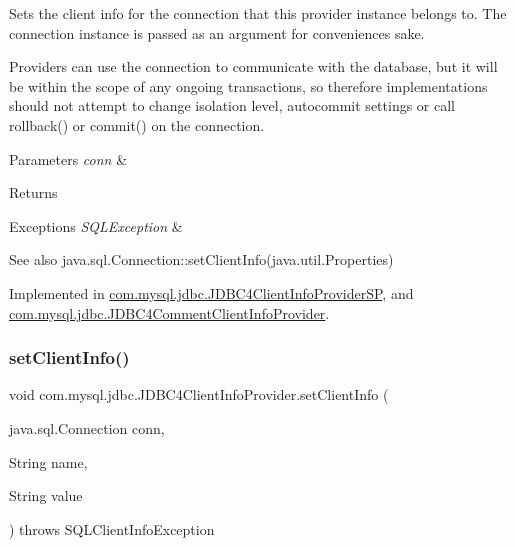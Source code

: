 Sets the client info for the connection that this provider instance belongs to. The connection instance is passed as an argument for convenience\textquotesingle{}s sake.

Providers can use the connection to communicate with the database, but it will be within the scope of any ongoing transactions, so therefore implementations should not attempt to change isolation level, autocommit settings or call rollback() or commit() on the connection.


\begin{DoxyParams}{Parameters}
{\em conn} & \\
\hline
\end{DoxyParams}
\begin{DoxyReturn}{Returns}

\end{DoxyReturn}

\begin{DoxyExceptions}{Exceptions}
{\em S\+Q\+L\+Exception} & \\
\hline
\end{DoxyExceptions}
\begin{DoxySeeAlso}{See also}
java.\+sql.\+Connection\+::set\+Client\+Info(java.\+util.\+Properties) 
\end{DoxySeeAlso}


Implemented in \mbox{\hyperlink{classcom_1_1mysql_1_1jdbc_1_1_j_d_b_c4_client_info_provider_s_p_a21bba24e53b2d29f6cfa456ea0d75d57}{com.\+mysql.\+jdbc.\+J\+D\+B\+C4\+Client\+Info\+Provider\+SP}}, and \mbox{\hyperlink{classcom_1_1mysql_1_1jdbc_1_1_j_d_b_c4_comment_client_info_provider_aa859dc068c85908783e59566c2ba32cf}{com.\+mysql.\+jdbc.\+J\+D\+B\+C4\+Comment\+Client\+Info\+Provider}}.

\mbox{\label{interfacecom_1_1mysql_1_1jdbc_1_1_j_d_b_c4_client_info_provider_ac4916282e520bf06380444e4703ae389}} 
\subsubsection{\texorpdfstring{set\+Client\+Info()}{setClientInfo()}\hspace{0.1cm}{\footnotesize\ttfamily [2/2]}}
{\footnotesize\ttfamily void com.\+mysql.\+jdbc.\+J\+D\+B\+C4\+Client\+Info\+Provider.\+set\+Client\+Info (\begin{DoxyParamCaption}\item[{java.\+sql.\+Connection}]{conn,  }\item[{String}]{name,  }\item[{String}]{value }\end{DoxyParamCaption}) throws S\+Q\+L\+Client\+Info\+Exception}

